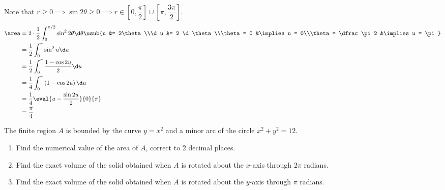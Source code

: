 \documentclass{jhwhw}
\begin{document}
    \solution
        Note that $r \geq 0 \implies \sin2\theta \geq 0 \implies r \in \left[0, \dfrac\pi2\right] \cup \left[\pi, \dfrac{3\pi}2\right]$.
        \begin{align*}
            \area &= 2 \cdot \dfrac12 \int_0^{\pi/2} \sin^2 2\theta \d \theta \usub{u &= 2\theta\\\d u &= 2 \d \theta\\\theta = 0 &\implies u = 0\\\theta = \dfrac\pi2 &\implies u = \pi}\\
            &= \dfrac12 \int_0^{\pi} \sin^2 u \d u\\
            &= \dfrac12 \int_0^{\pi} \dfrac{1 - \cos 2u}2 \d u\\
            &= \dfrac14 \int_0^{\pi} \left(1 - \cos 2u\right) \d u\\
            &= \dfrac14 \eval{u - \dfrac{\sin 2u}2}{0}{\pi}\\
            &= \dfrac\pi4
        \end{align*}


    \problem{}
        The finite region $A$ is bounded by the curve $y = x^2$ and a minor arc of the circle $x^2 + y^2 = 12$.

        \begin{enumerate}
            \item Find the numerical value of the area of $A$, correct to 2 decimal places.
            \item Find the exact volume of the solid obtained when $A$ is rotated about the $x$-axis through $2\pi$ radians.
            \item Find the exact volume of the solid obtained when $A$ is rotated about the $y$-axis through $\pi$ radians.
        \end{enumerate}
\end{document}

